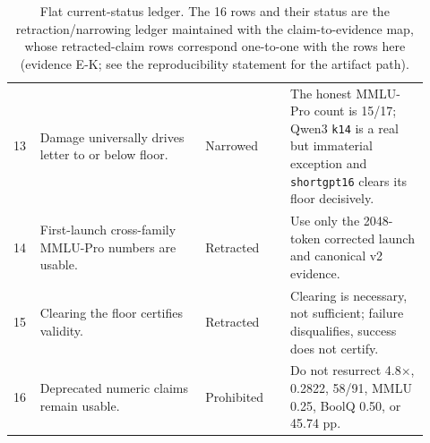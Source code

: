 \begin{table}[p]
\begin{tabular}{p{0.05\linewidth}p{0.37\linewidth}p{0.19\linewidth}p{0.31\linewidth}}
13 & Damage universally drives letter to or below floor. & Narrowed & The honest MMLU-Pro count is 15/17; Qwen3 \texttt{k14} is a real but immaterial exception and \texttt{shortgpt16} clears its floor decisively. \\
14 & First-launch cross-family MMLU-Pro numbers are usable. & Retracted & Use only the 2048-token corrected launch and canonical v2 evidence. \\
15 & Clearing the floor certifies validity. & Retracted & Clearing is necessary, not sufficient; failure disqualifies, success does not certify. \\
16 & Deprecated numeric claims remain usable. & Prohibited & Do not resurrect 4.8$\times$, 0.2822, 58/91, MMLU 0.25, BoolQ 0.50, or 45.74 pp. \\
\bottomrule
\end{tabular}
\caption{Flat current-status ledger. The 16 rows and their status are the retraction/narrowing ledger maintained with the claim-to-evidence map, whose retracted-claim rows correspond one-to-one with the rows here (evidence \textsf{E-K}; see the reproducibility statement for the artifact path).}
\label{tab:claims}
\end{table}
